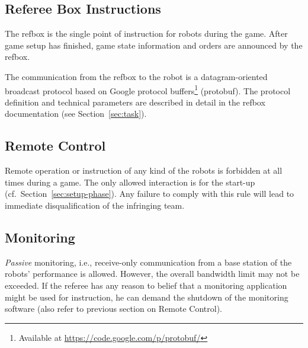 \documentclass[12pt,twoside]{article}
\newcommand{\refsec}[1]{Section~\ref{#1}}
\begin{document}
\subsection{Referee Box Instructions}
\label{sec:referee-box}
The \ac{refbox} is the single point of instruction for robots during the
game. After game setup has finished, game state information and orders
are announced by the \ac{refbox}.

The communication from the \ac{refbox} to the robot is a datagram-oriented
broadcast protocol based on Google protocol buffers\footnote{Available
at \mbox{\url{https://code.google.com/p/protobuf/}}} (protobuf). The
protocol definition and technical parameters are described in detail
in the \ac{refbox} documentation (see \refsec{sec:task}).

\subsection{Remote Control}
\label{sec:remote-control}
Remote operation or instruction of any kind of the robots is forbidden
at all times during a game. The only allowed interaction is for the
start-up (cf.~\refsec{sec:setup-phase}). Any failure to comply with
this rule will lead to immediate disqualification of the infringing
team.

\subsection{Monitoring}
\label{sec:monitoring}
\emph{Passive} monitoring, i.e., receive-only communication from a base
station of the robots' performance is allowed. However, the overall
bandwidth limit may not be exceeded.
If the referee has any reason to belief that a monitoring application
might be used for instruction, he can demand the shutdown of the
monitoring software (also refer to previous section on Remote
Control).
\end{document}
